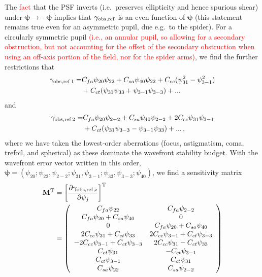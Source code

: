 \documentclass[usenatbib]{mnras}
\newcommand{\changetext}[1]{\textcolor{red}{#1}}
\begin{document}
The \changetext{fact} that the PSF inverts (i.e.\ preserves ellipticity and
hence spurious shear) under
${\boldsymbol\psi}\rightarrow-{\boldsymbol\psi}$ implies that
${\boldsymbol\gamma}_{\rm obs,ref}$ is an even function of
${\boldsymbol\psi}$ (this statement remains true even for an
asymmetric pupil, due e.g.\ to the spider). For a circularly symmetric
pupil \changetext{(i.e., an annular pupil, so allowing for a secondary obstruction, but not accounting for the offset of the secondary obstruction when using an off-axis portion of the field, nor for the spider arms)}, we find the further restrictions that
\begin{align}
\gamma_{\rm obs,ref\,1} =& C_{fa} \psi_{20} \psi_{22} + C_{sa} \psi_{40} \psi_{22}
+ C_{cc} (\psi_{31}^2-\psi_{3-1}^2) \nonumber\\
&+ C_{ct} (\psi_{31}\psi_{33} + \psi_{3-1}\psi_{3-3})
+ ... \label{eq:temp.314159}
\end{align}
and
\begin{align}
\gamma_{\rm obs,ref\,2} =& C_{fa} \psi_{20} \psi_{2-2} + C_{sa} \psi_{40} \psi_{2-2}
+ 2C_{cc} \psi_{31} \psi_{3-1} \nonumber\\
&+ C_{ct} (\psi_{31}\psi_{3-3} - \psi_{3-1}\psi_{33})
+ ...\,,
\end{align}
where we have taken the lowest-order aberrations (focus, astigmatism,
coma, trefoil, and spherical) as these dominate the wavefront
stability budget. With the wavefront error vector written in this
order, ${\boldsymbol\psi} = (\psi_{20}; \psi_{22},\psi_{2-2};
\psi_{31},\psi_{3-1}; \psi_{33},\psi_{3-3}; \psi_{40})$, we find a
sensitivity matrix
\begin{align}
{\bf M}^{\rm T} &= \left[ \frac{\partial \gamma_{{\rm obs,ref},i}}{\partial\psi_j} \right]^{\rm T}\nonumber\\
&= \left( \begin{array}{cc}
C_{fa}\psi_{22}  & C_{fa}\psi_{2-2} \\
C_{fa}\psi_{20}+C_{sa}\psi_{40} & 0 \\
0 & C_{fa}\psi_{20}+C_{sa}\psi_{40} \\
2C_{cc}\psi_{31}+C_{ct}\psi_{33} & 2C_{cc}\psi_{3-1}+C_{ct}\psi_{3-3} \\
-2C_{cc}\psi_{3-1}+C_{ct}\psi_{3-3} & 2C_{cc}\psi_{31}-C_{ct}\psi_{33} \\
C_{ct}\psi_{31} & -C_{ct}\psi_{3-1} \\
C_{ct}\psi_{3-1} & C_{ct}\psi_{31} \\
C_{sa}\psi_{22} & C_{sa}\psi_{2-2}
\end{array} \right)
\label{eq:TheMatrix}
\end{align}
\end{document}
